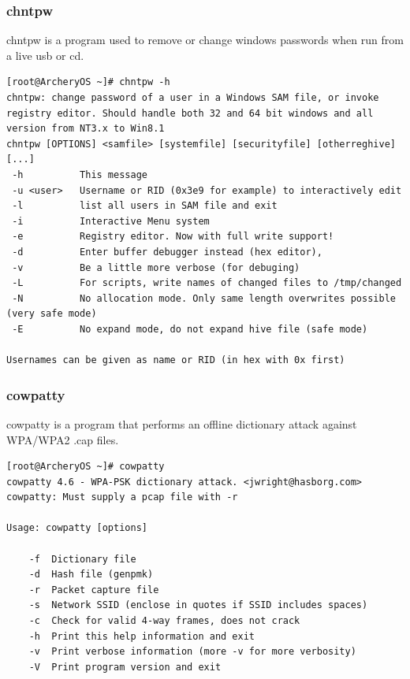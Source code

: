 \documentclass{article}
\begin{document}
\subsubsection{chntpw}
chntpw is a program used to remove or change windows passwords when run from a live usb or cd.
\begin{lstlisting}
[root@ArcheryOS ~]# chntpw -h
chntpw: change password of a user in a Windows SAM file, or invoke registry editor. Should handle both 32 and 64 bit windows and all version from NT3.x to Win8.1
chntpw [OPTIONS] <samfile> [systemfile] [securityfile] [otherreghive] [...]
 -h          This message
 -u <user>   Username or RID (0x3e9 for example) to interactively edit
 -l          list all users in SAM file and exit
 -i          Interactive Menu system
 -e          Registry editor. Now with full write support!
 -d          Enter buffer debugger instead (hex editor), 
 -v          Be a little more verbose (for debuging)
 -L          For scripts, write names of changed files to /tmp/changed
 -N          No allocation mode. Only same length overwrites possible (very safe mode)
 -E          No expand mode, do not expand hive file (safe mode)

Usernames can be given as name or RID (in hex with 0x first)
\end{lstlisting}

\subsubsection{cowpatty}
cowpatty is a program that performs an offline dictionary attack against WPA/WPA2 .cap files.
\begin{lstlisting}
[root@ArcheryOS ~]# cowpatty
cowpatty 4.6 - WPA-PSK dictionary attack. <jwright@hasborg.com>
cowpatty: Must supply a pcap file with -r

Usage: cowpatty [options]

	-f 	Dictionary file
	-d 	Hash file (genpmk)
	-r 	Packet capture file
	-s 	Network SSID (enclose in quotes if SSID includes spaces)
	-c 	Check for valid 4-way frames, does not crack
	-h 	Print this help information and exit
	-v 	Print verbose information (more -v for more verbosity)
	-V 	Print program version and exit
\end{lstlisting}
\end{document}
